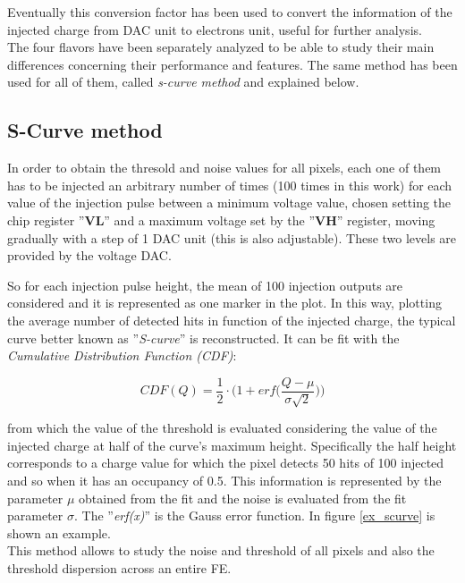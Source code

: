 Eventually this conversion factor has been used to convert the information of the injected charge from DAC unit to electrons unit, useful for further analysis.
\\
The four flavors have been separately analyzed to be able to study their main differences concerning their performance and features. The same method has been used for all of them, called \textit{s-curve method} and explained below. 


\subsection{S-Curve method} \label{threshold_subsection}

In order to obtain the thresold and noise values for all pixels, each one of them has to be injected an arbitrary number of times (100 times in this work) for each value of the injection pulse between a minimum voltage value, chosen setting the chip register ''\textbf{VL}'' and a maximum voltage set by the ''\textbf{VH}'' register, moving gradually with a step of 1 DAC unit (this is also adjustable). These two levels are provided by the voltage DAC.

So for each injection pulse height, the mean of 100 injection outputs are considered and it is represented as one marker in the plot.  In this way, plotting the average number of detected hits in function of the injected charge, the typical curve better known as ''\textit{S-curve}'' is reconstructed. It can be fit with the \textit{Cumulative Distribution Function (CDF)}:

\begin{equation}
 CDF(Q) = \frac{1}{2} \cdot \bigg(1 + \textit{erf}\bigg(\frac{Q-\mu}{\sigma \sqrt{2}}\bigg)\bigg)
\end{equation}

from which the value of the threshold is evaluated considering the value of the injected charge at half of the curve's maximum height. Specifically the half height corresponds to a charge value for which the pixel detects 50 hits of 100 injected and so when it has an occupancy of 0.5. This information is represented by the parameter $\mu$ obtained from the fit and the noise is evaluated from the fit parameter $\sigma$. The ''\textit{erf(x)}'' is the Gauss error function.  In figure \vref{ex_scurve} is shown an example. \\

This method allows to study the noise and threshold of all pixels and also the threshold dispersion across an entire FE.


